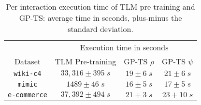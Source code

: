 
\begin{table}[!h]
	\caption{Per-interaction execution time of TLM pre-training and GP-TS: average time in seconds, plus-minus the standard deviation.}
	\vspace*{-2ex}
	\label{tab:pretraining_compcost} 
	\begin{center}
		\begin{tabular}{|c|c|c|c|}\hline
			 \cellcolor[gray]{0.5} &  \multicolumn{3}{c|}{Execution time in seconds \cellcolor[gray]{0.5} } \\ \cline{2-4}
			\multirow{-2}{*}{\cellcolor[gray]{0.5}Dataset} & TLM Pre-training \cellcolor[gray]{0.6} & GP-TS $\rho$ \cellcolor[gray]{0.6} & GP-TS $\psi$ \cellcolor[gray]{0.6} \\ \hline
			\cellcolor[gray]{0.95} \texttt{wiki-c4} 
				& $33,316 \pm 395 \; s$ \cellcolor[gray]{0.95} &  $19 \pm 6 \; s$  \cellcolor[gray]{0.95} &  $21 \pm 6 \; s$ \cellcolor[gray]{0.95} \\  \hline 
			\cellcolor[gray]{1.0} \texttt{mimic} 
				& $1489 \pm 46 \; s$ \cellcolor[gray]{1.0} &  $16 \pm 5 \; s$ \cellcolor[gray]{1.0} & $17 \pm 5 \; s$ \cellcolor[gray]{1.0} \\  \hline 
			\cellcolor[gray]{0.95} \texttt{e-commerce}
				& $37,392 \pm 494 \; s$ \cellcolor[gray]{0.95} & $21 \pm 3 \; s$ \cellcolor[gray]{0.95} & $23 \pm 10 \; s$ \cellcolor[gray]{0.95} \\  \hline 
		\end{tabular}
	\end{center}
\end{table}